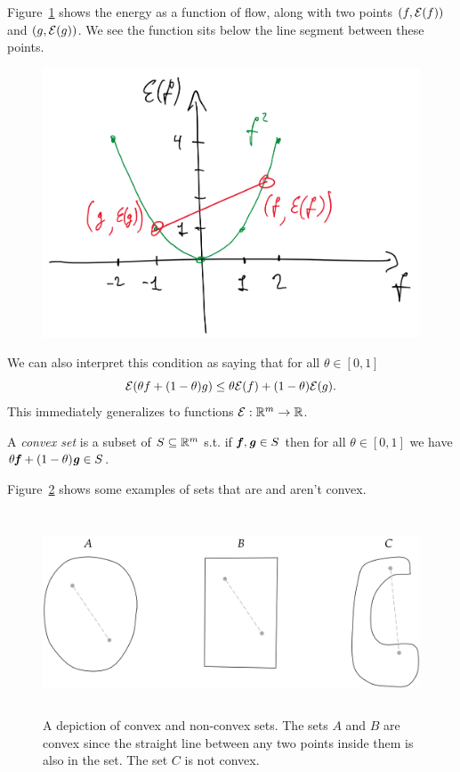 Figure~\ref{fig:flow-vs-energy-convex} shows the energy as a function of flow, along with two
points $(f, \mathcal{E}(f))$ and $(g,\mathcal{E}(g))$. We see the function sits below the
line segment between these points.

\begin{figure}[H]
  \centering
  \includegraphics[width=0.6\linewidth]{fig/lecture1_flow-vs-energy-convex.png}
  \label{fig:flow-vs-energy-convex}
\end{figure}
We can also interpret this condition as saying that for all $\theta \in [0,1]$
\[
  \mathcal{E}(\theta f + (1-\theta)g) \leq \theta \mathcal{E}(f) +
  (1-\theta) \mathcal{E}(g)
  .
  \]
This immediately generalizes to functions $\mathcal{E}:\mathbb{R}^m \to \mathbb{R}$.

A \emph{convex set} is a subset of $S \subseteq \mathbb{R}^m$ s.t.
if $\boldsymbol{\mathit{f}}, \boldsymbol{\mathit{g}} \in S$ then for all $\theta \in [0,1]$ we have
$\theta \boldsymbol{\mathit{f}} + (1-\theta) \boldsymbol{\mathit{g}} \in S$.

Figure~\ref{fig:convex_sets} shows some examples of sets that are and
aren't convex.

\begin{figure}[t]
\begin{centering}
                \includegraphics[trim = 0mm 0mm 0mm 0mm, height=60mm]{fig/lec1_convex_sets.pdf}
                 \caption{A depiction of convex and non-convex sets.  The sets $A$ and $B$ are convex since the straight line between any two points inside them is also in the set.  The set $C$ is not convex.}\label{fig:convex_sets}
                 \end{centering}
\end{figure}



